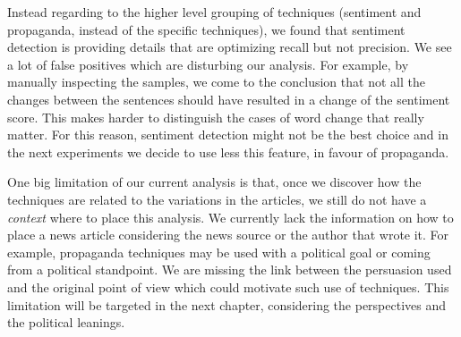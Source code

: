 Instead regarding to the higher level grouping of techniques (sentiment and propaganda, instead of the specific techniques), we found that sentiment detection is providing details that are optimizing recall but not precision. We see a lot of false positives which are disturbing our analysis.
For example, by manually inspecting the samples, we come to the conclusion that not all the changes between the sentences should have resulted in a change of the sentiment score.
This makes harder to distinguish the cases of word change that really matter. For this reason, sentiment detection might not be the best choice and in the next experiments we decide to use less this feature, in favour of propaganda.


One big limitation of our current analysis is that, once we discover how the techniques are related to the variations in the articles, we still do not have a \emph{context} where to place this analysis. We currently lack the information on how to place a news article considering the news source or the author that wrote it.
For example, propaganda techniques may be used with a political goal or coming from a political standpoint.
We are missing the link between the persuasion used and the original point of view which could motivate such use of techniques.
This limitation will be targeted in the next chapter, considering the perspectives and the political leanings.







